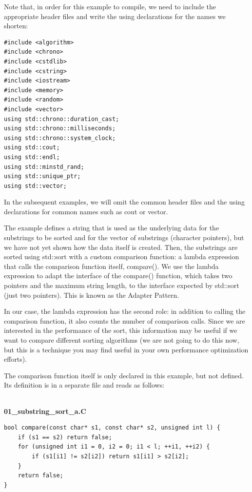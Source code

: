 Note that, in order for this example to compile, we need to include the appropriate header files and write the using declarations for the names we shorten:

\begin{lstlisting}[style=styleCXX]
#include <algorithm>
#include <chrono>
#include <cstdlib>
#include <cstring>
#include <iostream>
#include <memory>
#include <random>
#include <vector>
using std::chrono::duration_cast;
using std::chrono::milliseconds;
using std::chrono::system_clock;
using std::cout;
using std::endl;
using std::minstd_rand;
using std::unique_ptr;
using std::vector;
\end{lstlisting}

In the subsequent examples, we will omit the common header files and the using declarations for common names such as cout or vector.

The example defines a string that is used as the underlying data for the substrings to be sorted and for the vector of substrings (character pointers), but we have not yet shown how the data itself is created. Then, the substrings are sorted using std::sort with a custom comparison function: a lambda expression that calls the comparison function itself, compare(). We use the lambda expression to adapt the interface of the compare() function, which takes two pointers and the maximum string length, to the interface expected by std::sort (just two pointers). This is known as the Adapter Pattern.

In our case, the lambda expression has the second role: in addition to calling the comparison function, it also counts the number of comparison calls. Since we are interested in the performance of the sort, this information may be useful if we want to compare different sorting algorithms (we are not going to do this now, but this is a technique you may find useful in your own performance optimization efforts).

The comparison function itself is only declared in this example, but not defined. Its definition is in a separate file and reads as follows:


\hspace*{\fill} \\ %
\noindent
\textbf{01\_substring\_sort\_a.C}
\begin{lstlisting}[style=styleCXX]
bool compare(const char* s1, const char* s2, unsigned int l) {
	if (s1 == s2) return false;
	for (unsigned int i1 = 0, i2 = 0; i1 < l; ++i1, ++i2) {
		if (s1[i1] != s2[i2]) return s1[i1] > s2[i2];
	}
	return false;
}
\end{lstlisting}


